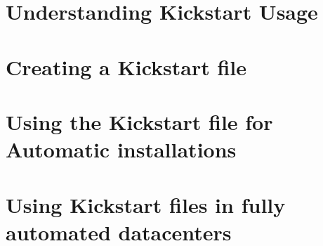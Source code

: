 
\usepackage{minted}
\usepackage{booktabs}


	
	
	\section{Understanding Kickstart Usage}
	
	
	
	\section{Creating a Kickstart file}
	\section{Using the Kickstart file for Automatic installations}
	\section{Using Kickstart files in fully automated datacenters}
		 



